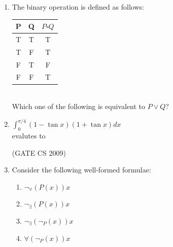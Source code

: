 \documentclass[a4paper, 11pt]{article}
\begin{document}
\begin{enumerate}
    \item  The binary operation is defined as follows:\\
    \begin{tabular}{|c|c|c|}
        \hline
        P & Q & $P\square Q$ \\
        \hline
        T & T & T \\
        \hline
        T & F & T \\
        \hline
        F & T & F \\
        \hline
        F & F & T\\
        \hline
    \end{tabular}\\
    Which one of the following is equivalent to $P \lor Q$?
    \begin{enumerate}
    \end{enumerate}

    \item $\int_0^{\pi/4} (1 - \tan x)(1 + \tan x)dx$\\
    evalutes to
    \begin{enumerate}
    \end{enumerate}

    \hfill (GATE CS 2009)

    \item Consider the following well-formed formulae:\\
    \begin{enumerate}[label=\Roman*]
        \item $\neg_ \forall (P(x))x$
        \item $\neg_ \exists (P(x))x$
        \item $\neg_ \exists (\neg_ P(x))x$
        \item $\forall (\neg_ P(x))x$
    \end{enumerate}


\end{enumerate}
\end{document}
